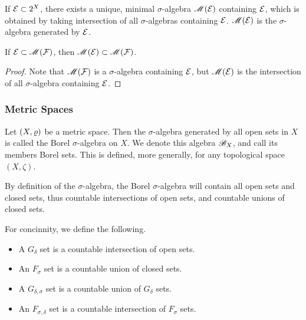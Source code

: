 \documentclass[12pt]{article} %
\begin{document}
\begin{proposition}
    If $\mathcal{E} \subset 2^X$, there exists a unique, minimal $\sigma$-algebra $\mathscr{M}(\mathcal{E})$ containing $\mathcal{E}$, which is obtained by taking intersection of all $\sigma$-algebras containing $\mathcal{E}$. $\mathscr{M}(\mathcal{E})$ is the $\sigma$-algebra generated by $\mathcal{E}$.
\end{proposition}


\begin{lemma}
    If $\mathcal{E} \subset \mathscr{M}(\mathcal{F})$, then $\mathscr{M}(\mathcal{E}) \subset \mathscr{M}(\mathcal{F})$.
\end{lemma}

\begin{proof}
    Note that $\mathscr{M}(\mathcal{F})$ is a $\sigma$-algebra containing $\mathcal{E}$, but $\mathscr{M}(\mathcal{E})$ is the intersection of all $\sigma$-algebra containing $\mathcal{E}$.
\end{proof}


\subsubsection{Metric Spaces}

\begin{definition}
    Let $(X, \varrho)$ be a metric space. Then the $\sigma$-algebra generated by all open sets in $X$ is called the Borel $\sigma$-algebra on $X$. We denote this algebra $\mathscr{B}_X$, and call its members Borel sets. This is defined, more generally, for any topological space $(X, \zeta)$.
\end{definition}

\begin{remark}
    By definition of the $\sigma$-algebra, the Borel $\sigma$-algebra will contain all open sets and closed sets, thus countable intersections of open sets, and countable unions of closed sets.
\end{remark}

\begin{definition}
    For concinnity, we define the following.
    \begin{itemize}
        \item A $G_\delta$ set is a countable intersection of open sets.
        \item An $F_\sigma$ set is a countable union of closed sets.
        \item A $G_{\delta, \sigma}$ set is a countable union of $G_\delta$ sets.
        \item An $F_{\sigma, \delta}$ set is a countable intersection of $F_\sigma$ sets.
    \end{itemize}
\end{definition}
\end{document}
